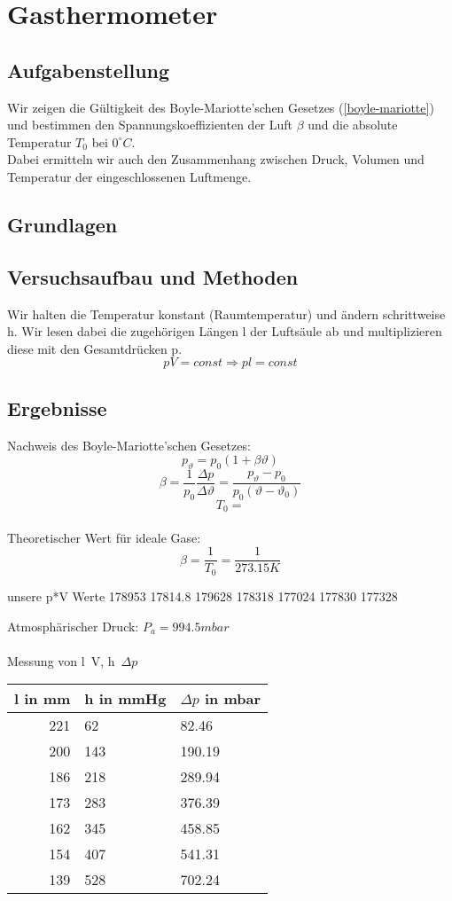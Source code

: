 \documentclass{article}
\begin{document}
\section{Gasthermometer}
\subsection{Aufgabenstellung}
Wir zeigen die Gültigkeit des Boyle-Mariotte'schen Gesetzes (\ref{boyle-mariotte}) und bestimmen den Spannungskoeffizienten der Luft $\beta$ und die absolute Temperatur $T_0$ bei $0^\circ C$.\\
Dabei ermitteln wir auch den Zusammenhang zwischen Druck, Volumen und Temperatur der eingeschlossenen Luftmenge.
\subsection{Grundlagen}
\subsection{Versuchsaufbau und Methoden}
Wir halten die Temperatur konstant (Raumtemperatur) und ändern schrittweise h. Wir lesen dabei die zugehörigen Längen l der Luftsäule ab und multiplizieren diese mit den Gesamtdrücken p. 
$$pV=const \Rightarrow pl=const$$
\subsection{Ergebnisse}
Nachweis des Boyle-Mariotte'schen Gesetzes:\\

$$p_{\vartheta}=p_0 (1+\beta \vartheta)$$
$$\beta=\frac{1}{p_0}\frac{\Delta p}{\Delta \vartheta}=\frac{p_{\vartheta}-p_0}{p_0(\vartheta - \vartheta_0)}$$
$$T_0=$$
\\
Theoretischer Wert für ideale Gase:\\
$$\beta=\frac{1}{T_0}=\frac{1}{273.15K}$$

unsere p*V Werte
178953
17814.8
179628
178318
177024
177830
177328

Atmosphärischer Druck: $P_a=994.5mbar$\\
\\
Messung von l~V, h~$\Delta p$
\begin{center}
\begin{tabular}{r|l|l}
l in mm & h in mmHg & $\Delta p$ in mbar\\
\hline
221 & 62 & 82.46\\
200 & 143 & 190.19\\
186 & 218 & 289.94\\
173 & 283 & 376.39\\
162 & 345 & 458.85\\
154 & 407 & 541.31\\
139 & 528 & 702.24\\
\end{tabular}
\end{center}
\end{document}
